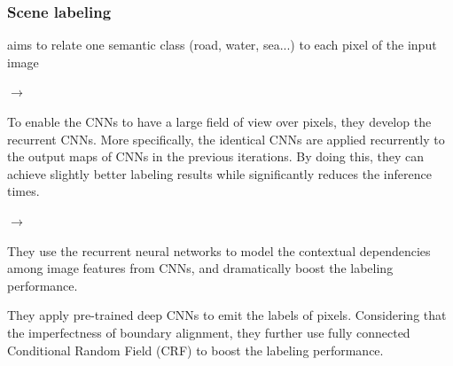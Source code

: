 \begin{frame}
	\frametitle{Scene labeling}


	 aims to relate one semantic class (road, water, sea...) to each pixel of the input image

	\bigskip

	$\rightarrow$ 

	To enable the CNNs to have a large field of view over pixels, they  develop the recurrent CNNs. More specifically, the identical CNNs are applied recurrently to the output maps of CNNs in the previous iterations. By doing this, they can achieve slightly better labeling results while significantly reduces the inference times.

	\bigskip

	$\rightarrow$

	They use the recurrent neural networks to model the contextual dependencies among image features from CNNs, and dramatically boost the labeling performance.

	\bigskip





	They apply pre-trained deep CNNs to emit the labels of pixels. Considering that the imperfectness of boundary alignment, they further use fully connected Conditional Random Field (CRF) to boost the labeling performance.




\end{frame}

